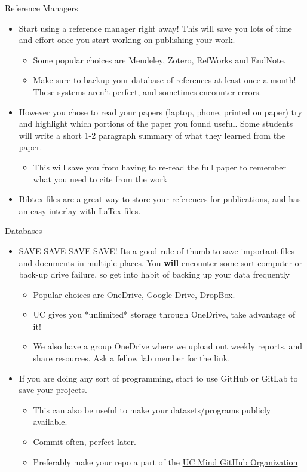 \documentclass[handout]{beamer}
\begin{document}
\begin{frame}{Reference Managers}
\begin{itemize}
  \item Start using a reference manager right away! This will save you lots of time and effort once you start working on publishing your work.
  \begin{itemize}
      \item Some popular choices are Mendeley, Zotero, RefWorks and EndNote. 
      \item Make sure to backup your database of references at least once a month! These systems aren't perfect, and sometimes encounter errors.
  \end{itemize}
  \item However you chose to read your papers (laptop, phone, printed on paper) try and highlight which portions of the paper you found useful. Some students will write a short 1-2 paragraph summary of what they learned from the paper.
  \begin{itemize}
      \item This will save you from having to re-read the full paper to remember what you need to cite from the work
  \end{itemize}
  \item Bibtex files are a great way to store your references for publications, and has an easy interlay with LaTex files. 
\end{itemize}
\end{frame}

\begin{frame}{Databases}
\begin{itemize}
  \item SAVE SAVE SAVE SAVE! Its a good rule of thumb to save important files and documents in multiple places. You \textbf{will} encounter some sort computer or back-up drive failure, so get into habit of backing up your data frequently
  \begin{itemize}
      \item Popular choices are OneDrive, Google Drive, DropBox.
      \item UC gives you *unlimited* storage through OneDrive, take advantage of it!
      \item We also have a group OneDrive where we upload out weekly reports, and share resources. Ask a fellow lab member for the link.
  \end{itemize}
  \item If you are doing any sort of programming, start to use GitHub or GitLab to save your projects. 
  \begin{itemize}
      \item This can also be useful to make your datasets/programs publicly available.
      \item Commit often, perfect later. 
      \item Preferably make your repo a part of the 
        \href{https://github.com/UC-Mind-Lab}{UC Mind GitHub Organization}
  \end{itemize}
\end{itemize}
\end{frame}
\end{document}
